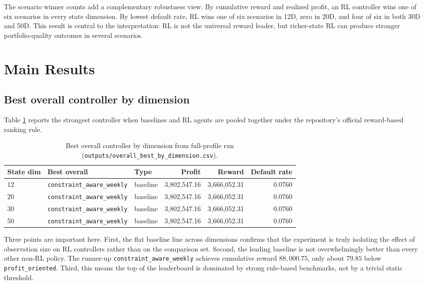 \documentclass[12pt,a4paper]{article}
\begin{document}
The scenario winner counts add a complementary robustness view. By cumulative reward and realized profit, an RL controller wins one of six scenarios in every state dimension. By lowest default rate, RL wins one of six scenarios in 12D, zero in 20D, and four of six in both 30D and 50D. This result is central to the interpretation: RL is not the universal reward leader, but richer-state RL can produce stronger portfolio-quality outcomes in several scenarios.

\section{Main Results}

\subsection{Best overall controller by dimension}

Table \ref{tab:en-best-overall} reports the strongest controller when baselines and RL agents are pooled together under the repository's official reward-based ranking rule.

\begin{table}[H]
    \centering
    \small
    \begin{tabular}{l l l r r r}
        \toprule
        State dim & Best overall                       & Type     & Profit           & Reward           & Default rate \\
        \midrule
        12        & \texttt{constraint\_aware\_weekly} & baseline & 3{,}802{,}547.16 & 3{,}666{,}052.31 & 0.0760       \\
        20        & \texttt{constraint\_aware\_weekly} & baseline & 3{,}802{,}547.16 & 3{,}666{,}052.31 & 0.0760       \\
        30        & \texttt{constraint\_aware\_weekly} & baseline & 3{,}802{,}547.16 & 3{,}666{,}052.31 & 0.0760       \\
        50        & \texttt{constraint\_aware\_weekly} & baseline & 3{,}802{,}547.16 & 3{,}666{,}052.31 & 0.0760       \\
        \bottomrule
    \end{tabular}
    \caption{Best overall controller by dimension from full-profile run (\texttt{outputs/overall\_best\_by\_dimension.csv}).}
    \label{tab:en-best-overall}
\end{table}

Three points are important here. First, the flat baseline line across dimensions confirms that the experiment is truly isolating the effect of observation size on RL controllers rather than on the comparison set. Second, the leading baseline is not overwhelmingly better than every other non-RL policy. The runner-up \texttt{constraint\_aware\_weekly} achieves cumulative reward $88{,}000.75$, only about $79.85$ below \texttt{profit\_oriented}. Third, this means the top of the leaderboard is dominated by strong rule-based benchmarks, not by a trivial static threshold.
\end{document}
